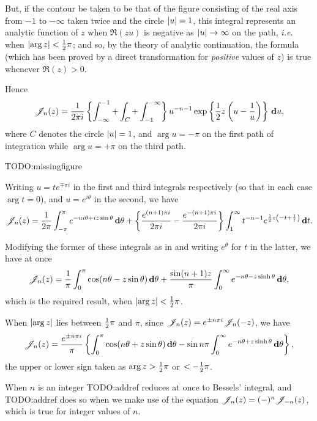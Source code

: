 But, if the contour be taken to be that of the figure consisting of
the real axis from $-1$ to $-\infty$ taken twice and the circle 
$\left| u \right| = 1$, this integral represents an analytic function of $z$
when $\Re(zu)$ is negative as
$\left| u \right| \rightarrow \infty$ on the path, \emph{i.e.} when 
$\left|  \arg z  \right| < \frac{1}{2} \pi$; and so, by the theory of analytic
continuation, the formula (which has been proved by a direct
transformation for \emph{positive} values of $z$) is true whenever 
$\Re(z) > 0$.

Hence
$$
\mathscr{J}_{n}(z)
=
\frac{1}{2\pi i}
\left\{ 
  \int_{-\infty}^{-1}
  +
  \int_{C}
  +
  \int_{-1}^{-\infty}
 \right\}
u^{-n-1}
\exp\left\{  \frac{1}{2} z \left(  u - \frac{1}{u}   \right)   \right\}
\, \mathbf{d} u,
$$
where $C$ denotes the circle $\left| u \right| = 1$, and 
$\arg u = -\pi$ on the first path of integration while 
$\arg u = +\pi$ on the third path.

TODO:missingfigure

Writing $u = t e^{\mp \pi i}$ in the first and third integrals
respectively (so that in each case $\arg t = 0$), and 
$u = e^{i\theta}$ in the second, we have
$$
\mathscr{J}_{n}(z) 
=
\frac{1}{2\pi}
\int_{-\pi}^{\pi}
e^{-ni\theta + iz\sin\theta}
\, \mathbf{d} \theta
+
\left\{ 
  \frac{e^{(n+1)\pi i}}{2\pi i}
  -
  \frac{e^{-(n+1)\pi i}}{2\pi i}
 \right\}
\int_{1}^{\infty}
t^{-n-1}
e^{\frac{1}{2} z \left( -t + \frac{1}{t} \right)}
\, \mathbf{d} t.
$$

Modifying the former of these integrals as in
 and writing 
$e^{\theta}$ for $t$ in the latter, we have at once
$$
\mathscr{J}_{n}(z)
=
\frac{1}{\pi}
\int_{0}^{\pi}
\cos(n\theta - z\sin\theta)
\, \mathbf{d}\theta
+
\frac{\sin(n+1)z}{\pi}
\int_{0}^{\infty}
e^{-n\theta - z\sinh\theta}
\, \mathbf{d} \theta,
$$
which is the required result, when
$\left| \arg z \right| < \frac{1}{2} \pi$.

When $\left|  \arg z  \right|$ lies between $\frac{1}{2} \pi$ and $\pi$, since 
$\mathscr{J}_{n}(z) = e^{\pm n\pi i} \mathscr{J}_{n}(-z)$, we have
\begin{equation}
  \mathscr{J}_{n}(z)
  =
  \frac{e^{\pm n \pi i}}{\pi}
  \left\{ 
    \int_{0}^{\pi} \cos(n\theta + z\sin\theta) \, \mathbf{d}\theta
    -
    \sin n\pi \int_{0}^{\infty} e^{-n\theta + z\sinh\theta} \, \mathbf{d}\theta
   \right\},
\end{equation}
the upper or lower sign taken as
$\arg z > \frac{1}{2} \pi$ or $< -\frac{1}{2} \pi$.

When $n$ is an integer TODO:addref reduces at once to Bessels'
integral, and TODO:addref does so when we make use of the equation 
$\mathscr{J}_{n}(z) = (-)^{n} \mathscr{J}_{-n}(z)$, which is true for integer values of $n$.


